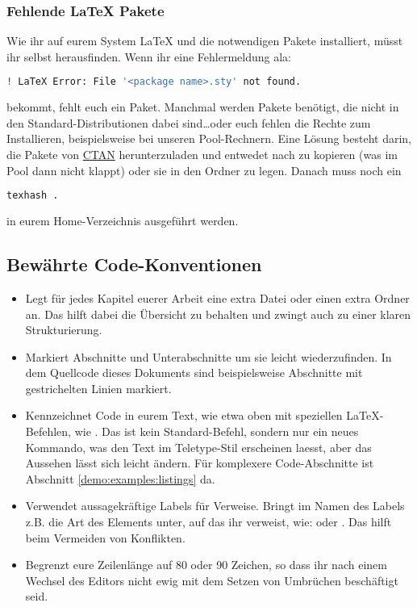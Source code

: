 \subsubsection{Fehlende \LaTeX{} Pakete}
%
Wie ihr auf eurem System \LaTeX{} und die notwendigen Pakete
installiert, müsst ihr selbst herausfinden.
%
Wenn ihr eine Fehlermeldung ala:
\begin{lstlisting}[language=bash]
! LaTeX Error: File '<package name>.sty' not found.
\end{lstlisting}
bekommt, fehlt euch ein Paket.
%
Manchmal werden Pakete benötigt, die nicht in den Standard-Distributionen dabei
sind\ldots oder euch fehlen die Rechte zum Installieren, beispielsweise bei
unseren Pool-Rechnern.
Eine Lösung besteht darin, die Pakete von
\href{http://www.ctan.org/}{CTAN} herunterzuladen und entwedet nach 
 zu kopieren (was im Pool dann nicht klappt)
oder sie in den Ordner  zu legen.
%
Danach muss noch ein
\begin{lstlisting}[language=bash]
texhash .
\end{lstlisting}
in eurem Home-Verzeichnis ausgeführt werden.
%
\subsection{Bewährte Code-Konventionen}
%
\begin{itemize}
    \item Legt für jedes Kapitel euerer Arbeit eine extra Datei oder einen
        extra Ordner an.
        Das hilft dabei die Übersicht zu behalten und zwingt auch zu einer
        klaren Strukturierung.
    \item Markiert Abschnitte und Unterabschnitte um sie leicht wiederzufinden.
        In dem Quellcode dieses Dokuments sind beispielsweise Abschnitte
        mit gestrichelten Linien markiert.
    \item Kennzeichnet Code in eurem Text, wie etwa  oben
        mit speziellen \LaTeX-Befehlen, wie .
        Das ist kein Standard-Befehl, sondern nur ein neues Kommando,
        was den Text im Teletype-Stil erscheinen laesst, aber das Aussehen
        lässt sich leicht ändern.
        Für komplexere Code-Abschnitte ist Abschnitt \ref{demo:examples:listings}
        da.
    \item Verwendet aussagekräftige Labels für Verweise. 
        Bringt im Namen des Labels z.B. die Art des Elements unter, auf das
        ihr verweist, wie:
         oder
		. 
        Das hilft beim Vermeiden von Konflikten.
    \item Begrenzt eure Zeilenlänge auf 80 oder 90 Zeichen, so dass ihr nach
        einem Wechsel des Editors nicht ewig mit dem Setzen von Umbrüchen
        beschäftigt seid.
\end{itemize}
%
